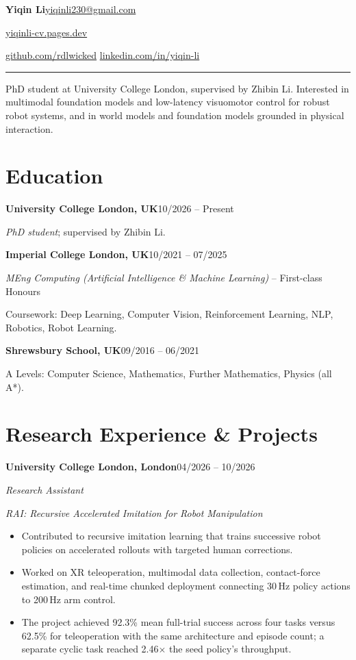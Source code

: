 \documentclass[a4paper,10pt]{article}
\newcommand{\project}[1]{\vspace{0.25em}\textit{#1}\par}
\providecommand{\cvphone}{}
\begin{document}
\raggedright
\fontsize{11}{14}\selectfont

{\LARGE\textbf{Yiqin Li}}\hfill\href{mailto:yiqinli230@gmail.com}{yiqinli230@gmail.com}\par
\href{https://yiqinli-cv.pages.dev/}{yiqinli-cv.pages.dev}\hfill\cvphone\par
\href{https://github.com/rdlwicked}{github.com/rdlwicked}\hfill
\href{https://linkedin.com/in/yiqin-li}{linkedin.com/in/yiqin-li}
\vspace{0.4em}\hrule\vspace{0.45em}

PhD student at University College London, supervised by Zhibin Li. Interested in multimodal foundation models and low-latency visuomotor control for robust robot systems, and in world models and foundation models grounded in physical interaction.

\section*{Education}
\textbf{University College London, UK}\hfill 10/2026 -- Present\par
\textit{PhD student}; supervised by Zhibin Li.
\vspace{0.4em}\par
\textbf{Imperial College London, UK}\hfill 10/2021 -- 07/2025\par
\textit{MEng Computing (Artificial Intelligence \& Machine Learning)} -- First-class Honours\par
Coursework: Deep Learning, Computer Vision, Reinforcement Learning, NLP, Robotics, Robot Learning.
\vspace{0.4em}\par
\textbf{Shrewsbury School, UK}\hfill 09/2016 -- 06/2021\par
A Levels: Computer Science, Mathematics, Further Mathematics, Physics (all A*).

\section*{Research Experience \& Projects}
\textbf{University College London, London}\hfill 04/2026 -- 10/2026\par
\textit{Research Assistant}

\project{RAI: Recursive Accelerated Imitation for Robot Manipulation}
\begin{itemize}
\item Contributed to recursive imitation learning that trains successive robot policies on accelerated rollouts with targeted human corrections.
\item Worked on XR teleoperation, multimodal data collection, contact-force estimation, and real-time chunked deployment connecting 30\,Hz policy actions to 200\,Hz arm control.
\item The project achieved 92.3\% mean full-trial success across four tasks versus 62.5\% for teleoperation with the same architecture and episode count; a separate cyclic task reached 2.46$\times$ the seed policy's throughput.
\end{itemize}
\end{document}
